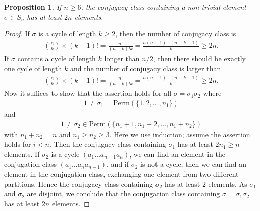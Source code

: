 \documentclass[12pt]{report}
\theoremstyle{plain}
\newtheorem{proposition}[theorem]{Proposition}
\theoremstyle{remark}
\theoremstyle{definition}
\begin{document}
\begin{proposition}\label{Proposition 1.15.7.}
    If $n\ge 6$, the conjugacy class containing a non-trivial element $\sigma\in S_n$ has at least $2n$ elements.
\end{proposition}
\begin{proof}
    If $\sigma$ is a cycle of length $k\ge 2$, then the number of conjugacy class is
    \begin{align*}
        {n\choose k}\times (k-1)! = \frac{n!}{(n-k)!k}= \frac{n(n-1)\cdots(n-k+1)}{k}\ge 2n.
    \end{align*} 
    If $\sigma$ contains a cycle of length $k$ longer than $n/2$, then there should be exactly one cycle of length $k$ and the number of conjugacy class is larger than
    \begin{align*}
        {n\choose k}\times (k-1)! = \frac{n!}{(n-k)!k}= \frac{n(n-1)\cdots(n-k+1)}{k}\ge 2n.
    \end{align*}
    Now it suffices to show that the assertion holds for all $\sigma=\sigma_1\sigma_2$ where
    \begin{align*}
        1\neq \sigma_1 = \mathrm{Perm}(\{1,2,\dots,n_1\})
    \end{align*}
    and
    \begin{align*}
        1\neq \sigma_2 \in \mathrm{Perm}(\{n_1+1,n_1+2,\dots,n_1+n_2\})
    \end{align*}
    with $n_1+n_2=n$ and $n_1\ge n_2\ge 3$. Here we use induction; assume the assertion holds for $i<n$. Then the conjugacy class containing $\sigma_1$ has at least $2n_1\ge n$ elements. If $\sigma_2$ is a cycle $(a_1\dots a_{n-1} a_n)$, we can find an element in the conjugation class $(a_1\dots a_n a_{n-1})$, and if $\sigma_2$ is not a cycle, then we can find an element in the conjugation class, exchanging one element from two different partitions. Hence the conjugacy class containing $\sigma_2$ has at least $2$ elements. As $\sigma_1$ and $\sigma_2$ are disjoint, we conclude that the conjugation class containing $\sigma=\sigma_1\sigma_2$ has at least $2n$ elements.
\end{proof}
\end{document}

